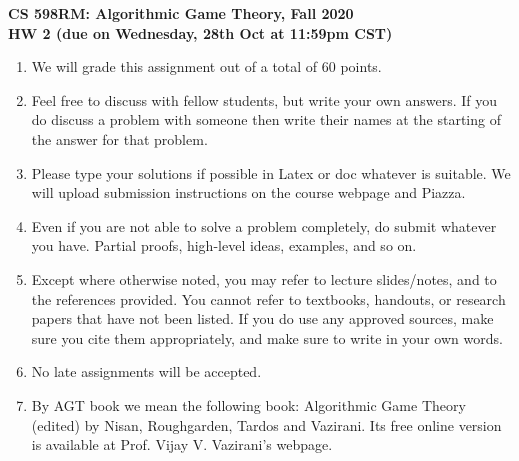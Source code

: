 \documentclass[11pt]{article}
\begin{document}
\setlength{\parskip}{.1 in}

\begin{center}
\LARGE
\textbf{CS 598RM: Algorithmic Game Theory, Fall 2020}
\\[0.5ex]
\textbf{HW 2 (due on Wednesday, 28th Oct at 11:59pm CST)}
\end{center}


\begin{enumerate}
\item We will grade this assignment out of a total of 60 points. 
\item Feel free to discuss with fellow students, but write your own answers. If you do discuss a problem with someone then write their
names at the starting of the answer for that problem.
\item Please type your solutions if possible in Latex or doc whatever is suitable. We will upload submission instructions on the course webpage and Piazza.
\item Even if you are not able to solve a problem completely, do submit whatever you have. Partial proofs, high-level ideas, examples,
and so on.
\item Except where otherwise noted, you may refer to lecture slides/notes, and to the references provided. 
You cannot refer to textbooks, handouts, or research papers that have not been listed. If you do use any approved sources, make 
sure you cite them appropriately, and make sure to write in your own words.
\item No late assignments will be accepted.
\item By AGT book we mean the following book: Algorithmic Game Theory (edited) by Nisan, Roughgarden, Tardos and Vazirani. 
Its free online version is available at Prof. Vijay V. Vazirani's webpage.
\end{enumerate}
\medskip
\medskip

\noindent\makebox[\linewidth]{\rule{\textwidth}{0.4pt}}
\end{document}
